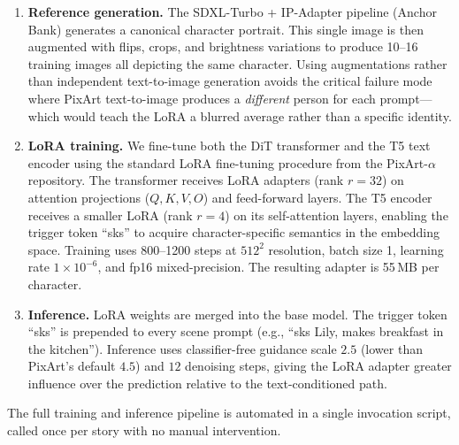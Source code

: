 \begin{enumerate}
  \item \textbf{Reference generation.} The SDXL-Turbo + IP-Adapter pipeline (Anchor Bank) generates a canonical character portrait. This single image is then augmented with flips, crops, and brightness variations to produce 10--16 training images all depicting the same character. Using augmentations rather than independent text-to-image generation avoids the critical failure mode where PixArt text-to-image produces a \emph{different} person for each prompt---which would teach the LoRA a blurred average rather than a specific identity.

  \item \textbf{LoRA training.} We fine-tune both the DiT transformer and the T5 text encoder using the standard LoRA fine-tuning procedure from the PixArt-$\alpha$ repository. The transformer receives LoRA adapters (rank $r=32$) on attention projections ($Q, K, V, O$) and feed-forward layers. The T5 encoder receives a smaller LoRA (rank $r=4$) on its self-attention layers, enabling the trigger token ``sks'' to acquire character-specific semantics in the embedding space. Training uses 800--1200 steps at $512^2$ resolution, batch size 1, learning rate $1\times10^{-6}$, and fp16 mixed-precision. The resulting adapter is 55\,MB per character.

  \item \textbf{Inference.} LoRA weights are merged into the base model. The trigger token ``sks'' is prepended to every scene prompt (e.g., ``sks Lily, makes breakfast in the kitchen''). Inference uses classifier-free guidance scale $2.5$ (lower than PixArt's default $4.5$) and $12$ denoising steps, giving the LoRA adapter greater influence over the prediction relative to the text-conditioned path.
\end{enumerate}

The full training and inference pipeline is automated in a single invocation script, called once per story with no manual intervention.
